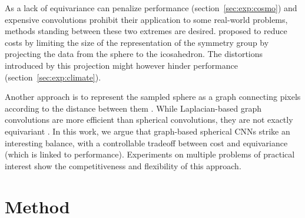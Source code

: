 \documentclass{article} %
\newcommand{\todo}[1]{{\color[rgb]{.6,.1,.6}{#1}}}
\newcommand{\secref}[1]{section~\ref{sec:#1}}
\begin{document}
As a lack of equivariance can penalize performance (\secref{exp:cosmo}) and expensive convolutions prohibit their application to some real-world problems, methods standing between these two extremes are desired.
\citet{cohen2019gauge} proposed to reduce costs by limiting the size of the representation of the symmetry group by projecting the data from the sphere to the icosahedron.
The distortions introduced by this projection might however hinder performance (\secref{exp:climate}).

Another approach is to represent the sampled sphere as a graph connecting pixels according to the distance between them \citep{bruna2013gnn, khasanova2017sphericalcnn, perraudin2019deepspherecosmo}.
While Laplacian-based graph convolutions are more efficient than spherical convolutions, they are not exactly equivariant \citep{defferrard2019deepsphereequiv}.
In this work, we argue that graph-based spherical CNNs strike an interesting balance, with a controllable tradeoff between cost and equivariance (which is linked to performance).
Experiments on multiple problems of practical interest show the competitiveness and flexibility of this approach.

\section{Method}

\end{document}
